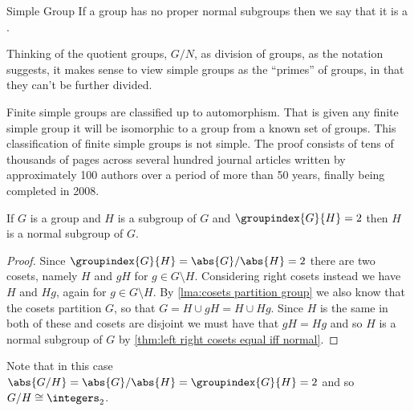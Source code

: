\documentclass[fleqn]{NotesClass}
\newcommand*{\union}{\cup}
\newcommand*{\isomorphic}{\cong}
\begin{document}
    \begin{dfn}{Simple Group}{}
        If a group has no proper normal subgroups then we say that it is a .
    \end{dfn}
    
    Thinking of the quotient groups, \(G/N\), as division of groups, as the notation suggests, it makes sense to view simple groups as the \enquote{primes} of groups, in that they can't be further divided.
    
    Finite simple groups are classified up to automorphism.
    That is given any finite simple group it will be isomorphic to a group from a known set of groups.
    This classification of finite simple groups is not simple.
    The proof consists of tens of thousands of pages across several hundred journal articles written by approximately 100 authors over a period of more than 50 years, finally being completed in 2008.
    
    \begin{thm}{}{}
        If \(G\) is a group and \(H\) is a subgroup of \(G\) and \(\groupindex{G}{H} = 2\) then \(H\) is a normal subgroup of \(G\).
        \begin{proof}
            Since \(\groupindex{G}{H} = \abs{G}/\abs{H} = 2\) there are two cosets, namely \(H\) and \(gH\) for \(g \in G \setminus H\).
            Considering right cosets instead we have \(H\) and \(Hg\), again for \(g \in G \setminus H\).
            By \cref{lma:cosets partition group} we also know that the cosets partition \(G\), so that \(G = H \union gH = H \union Hg\).
            Since \(H\) is the same in both of these and cosets are disjoint we must have that \(gH = Hg\) and so \(H\) is a normal subgroup of \(G\) by \cref{thm:left right cosets equal iff normal}.
        \end{proof}
    \end{thm}
    
    Note that in this case \(\abs{G/H} = \abs{G}/\abs{H} = \groupindex{G}{H} = 2\) and so \(G/H \isomorphic \integers_2\).
    
\end{document}
